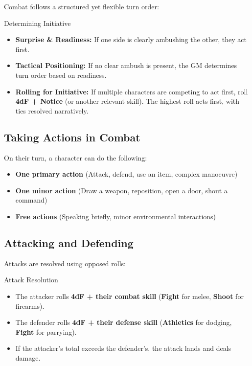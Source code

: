 Combat follows a structured yet flexible turn order:

\begin{DndReadAloud}{Determining Initiative}
\begin{itemize}
    \item \textbf{Surprise \& Readiness:} If one side is clearly ambushing the other, they act first.
    \item \textbf{Tactical Positioning:} If no clear ambush is present, the GM determines turn order based on readiness.
    \item \textbf{Rolling for Initiative:} If multiple characters are competing to act first, roll \textbf{4dF + Notice} (or another relevant skill). The highest roll acts first, with ties resolved narratively.
\end{itemize}
\end{DndReadAloud}

\subsection{Taking Actions in Combat}

On their turn, a character can do the following:
\begin{itemize}
    \item \textbf{One primary action} (Attack, defend, use an item, complex manoeuvre)
    \item \textbf{One minor action} (Draw a weapon, reposition, open a door, shout a command)
    \item \textbf{Free actions} (Speaking briefly, minor environmental interactions)
\end{itemize}

\subsection{Attacking and Defending}

Attacks are resolved using opposed rolls:
\begin{DndReadAloud}{Attack Resolution}
\begin{itemize}
    \item The attacker rolls \textbf{4dF + their combat skill} (\textbf{Fight} for melee, \textbf{Shoot} for firearms).
    \item The defender rolls \textbf{4dF + their defense skill} (\textbf{Athletics} for dodging, \textbf{Fight} for parrying).
    \item If the attacker’s total exceeds the defender’s, the attack lands and deals damage.
\end{itemize}
\end{DndReadAloud}

